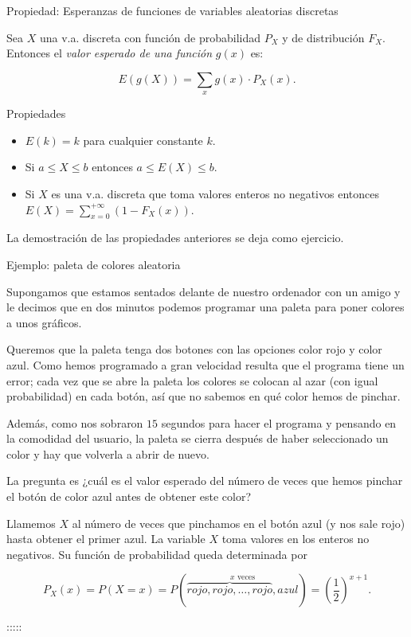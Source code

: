 \documentclass[
  letterpaper,
  DIV=11,
  numbers=noendperiod]{scrreprt}
\providecommand{\tightlist}{%
  \setlength{\itemsep}{0pt}\setlength{\parskip}{0pt}}\usepackage{longtable,booktabs,array}
\begin{document}
Propiedad: Esperanzas de funciones de variables aleatorias discretas

Sea \(X\) una v.a. discreta con función de probabilidad \(P_{X}\) y de
distribución \(F_{X}\). Entonces el \emph{valor esperado de una función}
\(g(x)\) es:

\[E(g(X))=\sum_{x}g(x) \cdot  P_{X}(x).\]

Propiedades

\begin{itemize}
\tightlist
\item
  \(E(k)=k\) para cualquier constante \(k\).
\item
  Si \(a\leq X\leq b\) entonces \(a\leq E(X)\leq b\).
\item
  Si \(X\) es una v.a. discreta que toma valores enteros no negativos
  entonces \(E(X)=\sum_{x=0}^{+\infty}(1- F_X(x)).\)
\end{itemize}

La demostración de las propiedades anteriores se deja como ejercicio.

Ejemplo: paleta de colores aleatoria

Supongamos que estamos sentados delante de nuestro ordenador con un
amigo y le decimos que en dos minutos podemos programar una paleta para
poner colores a unos gráficos.

Queremos que la paleta tenga dos botones con las opciones color rojo y
color azul. Como hemos programado a gran velocidad resulta que el
programa tiene un error; cada vez que se abre la paleta los colores se
colocan al azar (con igual probabilidad) en cada botón, así que no
sabemos en qué color hemos de pinchar.

Además, como nos sobraron \(15\) segundos para hacer el programa y
pensando en la comodidad del usuario, la paleta se cierra después de
haber seleccionado un color y hay que volverla a abrir de nuevo.

La pregunta es ¿cuál es el valor esperado del número de veces que hemos
pinchar el botón de color azul antes de obtener este color?

Llamemos \(X\) al número de veces que pinchamos en el botón azul (y nos
sale rojo) hasta obtener el primer azul. La variable \(X\) toma valores
en los enteros no negativos. Su función de probabilidad queda
determinada por

\[
P_X(x)=P(X=x)=P(\stackrel{x \mbox{ veces}}{\overbrace{rojo, rojo,\ldots,rojo},azul})
=\left(\frac12\right)^{x+1}.
\]

:::::
\end{document}
